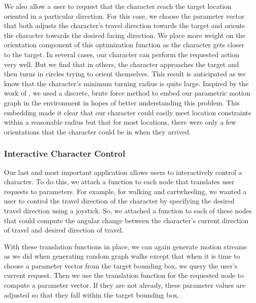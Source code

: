\documentclass[10pt,twocolumn]{article}
\begin{document}
We also allow a user to request that the character reach the target location oriented in a particular direction. For this case, we choose the parameter vector that both adjusts the character's travel direction towards the target and orients the character towards the desired facing direction. We place more weight on the orientation component of this optimization function as the character gets closer to the target. In several cases, our character can perform the requested action very well. But we find that in others, the character approaches the target and then turns in circles trying to orient themselves. This result is anticipated as we know that the character's minimum turning radius is quite large. Inspired by the work of \citet{reitsma2004}, we used a discrete, brute force method to embed our parametric motion graph in the environment in hopes of better understanding this problem. This embedding made it clear that our character could easily meet location constraints within a reasonable radius but that for most locations, there were only a few orientations that the character could be in when they arrived.

\subsubsection{Interactive Character Control}

Our last and most important application allows users to interactively control a character. To do this, we attach a function to each node that translates user requests to parameters. For example, for walking and cartwheeling, we wanted a user to control the travel direction of the character by specifying the desired travel direction using a joystick. So, we attached a function to each of these nodes that could compute the angular change between the character's current direction of travel and desired direction of travel.

With these translation functions in place, we can again generate motion streams as we did when generating random graph walks except that when it is time to choose a parameter vector from the target bounding box, we query the user's current request. Then we use the translation function for the requested node to compute a parameter vector. If they are not already, these parameter values are adjusted so that they fall within the target bounding box.
\end{document}
